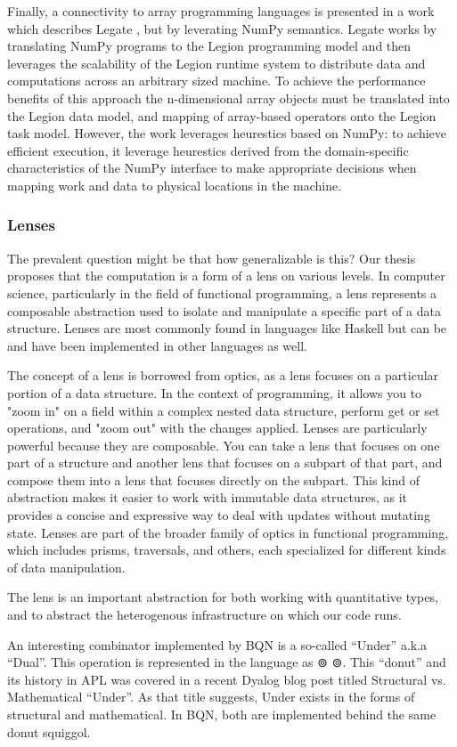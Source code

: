 \documentclass[10pt,a4paper]{article}
\begin{document}
Finally, a connectivity to array programming languages is presented in a work which describes Legate \cite{LegateNumpyBauer2019}, but by leverating NumPy semantics.
Legate works by translating NumPy programs to the Legion programming model and then leverages the scalability of the Legion runtime system to distribute data and computations across an arbitrary sized machine.
To achieve the performance benefits of this approach the n-dimensional array objects must be translated into the Legion data model, and mapping of array-based operators onto the Legion task model.
However, the work leverages heurestics based on NumPy: to achieve efficient execution, it leverage heurestics derived from the domain-specific characteristics of the NumPy interface to make appropriate decisions when mapping work and data to physical locations in the machine.

\subsubsection{Lenses}

The prevalent question might be that how generalizable is this?
Our thesis proposes that the computation is a form of a lens on various levels.
In computer science, particularly in the field of functional programming, a lens represents a composable abstraction used to isolate and manipulate a specific part of a data structure. Lenses are most commonly found in languages like Haskell but can be and have been implemented in other languages as well.

The concept of a lens is borrowed from optics, as a lens focuses on a particular portion of a data structure. In the context of programming, it allows you to "zoom in" on a field within a complex nested data structure, perform get or set operations, and "zoom out" with the changes applied.
Lenses are particularly powerful because they are composable. You can take a lens that focuses on one part of a structure and another lens that focuses on a subpart of that part, and compose them into a lens that focuses directly on the subpart.
This kind of abstraction makes it easier to work with immutable data structures, as it provides a concise and expressive way to deal with updates without mutating state. Lenses are part of the broader family of optics in functional programming, which includes prisms, traversals, and others, each specialized for different kinds of data manipulation.

The lens is an important abstraction for both working with quantitative types, and to abstract the heterogenous infrastructure on which our code runs.

An interesting combinator implemented by BQN is a so-called “Under” a.k.a “Dual”. This operation is represented in the language as
⊚
⊚. This “donut” and its history in APL was covered in a recent Dyalog blog post titled Structural vs. Mathematical “Under”. As that title suggests, Under exists in the forms of structural and mathematical. In BQN, both are implemented behind the same donut squiggol.


\newpage
\printbibliography
\end{document}
